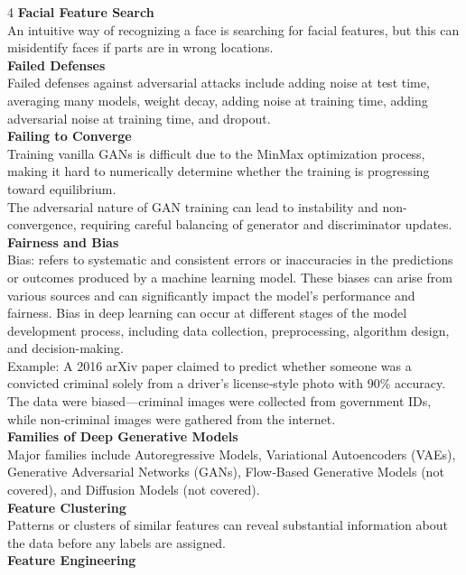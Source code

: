 \documentclass[8pt]{extarticle}
\begin{document}
\begin{multicols}{4}
\vspace{2pt}\textbf{Facial Feature Search}\\
An intuitive way of recognizing a face is searching for facial features, but this can misidentify faces if parts are in wrong locations.\\
\vspace{2pt}\textbf{Failed Defenses}\\
Failed defenses against adversarial attacks include adding noise at test time, averaging many models, weight decay, adding noise at training time, adding adversarial noise at training time, and dropout.\\
\vspace{2pt}\textbf{Failing to Converge}\\
Training vanilla GANs is difficult due to the MinMax optimization process, making it hard to numerically determine whether the training is progressing toward equilibrium.\\
The adversarial nature of GAN training can lead to instability and non-convergence, requiring careful balancing of generator and discriminator updates.\\
\vspace{2pt}\textbf{Fairness and Bias}\\
Bias: refers to systematic and consistent errors or inaccuracies in the predictions or outcomes produced by a machine learning model. These biases can arise from various sources and can significantly impact the model’s performance and fairness. Bias in deep learning can occur at different stages of the model development process, including data collection, preprocessing, algorithm design, and decision-making.\\
Example: A 2016 arXiv paper claimed to predict whether someone was a convicted criminal solely from a driver’s license‑style photo with 90\% accuracy. The data were biased—criminal images were collected from government IDs, while non‑criminal images were gathered from the internet.\\
\vspace{2pt}\textbf{Families of Deep Generative Models}\\
Major families include Autoregressive Models, Variational Autoencoders (VAEs), Generative Adversarial Networks (GANs), Flow‑Based Generative Models (not covered), and Diffusion Models (not covered).\\
\vspace{2pt}\textbf{Feature Clustering}\\
Patterns or clusters of similar features can reveal substantial information about the data before any labels are assigned.\\
\vspace{2pt}\textbf{Feature Engineering}\\


\end{multicols}
\end{document}

